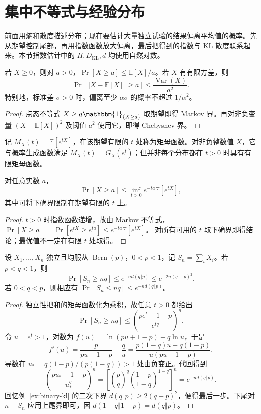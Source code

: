 \documentclass[lang=cn,a4paper,fontset=none,zihao=false,10pt,openany,twoside]{beautybook}
\numberwithin{algorithm}{chapter}
\newcommand{\KLsep}{\mathrel{\Vert}}
\begin{document}
\section{集中不等式与经验分布}\label{sec:concentration}
前面用熵和散度描述分布；现在要估计大量独立试验的结果偏离平均值的概率。先从期望控制尾部，再用指数函数放大偏离，最后把得到的指数与 KL 散度联系起来。本节指数估计中的 $H,D_{\mathrm{KL}},d$ 均使用自然对数。
\begin{proposition}\label{prop:markov-chebyshev}
若 $X\ge0$，则对 $a>0$，$\Pr[X\ge a]\le\mathbb E[X]/a$。若 $X$ 有有限方差，则
\[
 \Pr[|X-\mathbb E[X]|\ge a]\le\frac{\operatorname{Var}(X)}{a^2}.
\]
特别地，标准差 $\sigma>0$ 时，偏离至少 $\alpha\sigma$ 的概率不超过 $1/\alpha^2$。
\end{proposition}
\begin{proof}
点态不等式 $X\ge a\mathbbm{1}_{\{X\ge a\}}$ 取期望即得 Markov 界。再对非负变量 $(X-\mathbb E[X])^2$ 及阈值 $a^2$ 使用它，即得 Chebyshev 界。
\end{proof}
\begin{definition}[矩母函数]
记 $M_X(t)=\mathbb E[e^{tX}]$，在该期望有限的 $t$ 处称为矩母函数。对非负整数值 $X$，它与概率生成函数满足 $M_X(t)=G_X(e^t)$；但并非每个分布都在 $t>0$ 时具有有限矩母函数。
\end{definition}
\begin{proposition}[Chernoff 界]\label{prop:chernoff}
对任意实数 $a$，
\[
 \Pr[X\ge a]\le\inf_{t>0}e^{-ta}\mathbb E[e^{tX}],
\]
其中可将下确界限制在期望有限的 $t$ 上。
\end{proposition}
\begin{proof}
$t>0$ 时指数函数递增，故由 Markov 不等式，
$\Pr[X\ge a]=\Pr[e^{tX}\ge e^{ta}]\le e^{-ta}\mathbb E[e^{tX}]$。
对所有可用的 $t$ 取下确界即得结论；最优值不一定在有限 $t$ 处取得。
\end{proof}
\begin{example}\label{ex:bernoulli-chernoff}
设 $X_1,\ldots,X_n$ 独立且均服从 $\operatorname{Bern}(p)$，$0<p<1$，记 $S_n=\sum_iX_i$。若 $p<q<1$，则
\[
 \Pr[S_n\ge nq]\le e^{-nd(q\KLsep p)}\le e^{-2n(q-p)^2}.
\]
若 $0<q<p$，则相应有 $\Pr[S_n\le nq]\le e^{-nd(q\KLsep p)}$。
\end{example}
\begin{proof}
独立性把和的矩母函数化为乘积，故任意 $t>0$ 都给出
\[
 \Pr[S_n\ge nq]\le\left(\frac{pe^t+1-p}{e^{tq}}\right)^n.
\]
令 $u=e^t>1$，对数为 $f(u)=\ln(pu+1-p)-q\ln u$，于是
\[
 f'(u)=\frac p{pu+1-p}-\frac qu
 =\frac{p(1-q)u-q(1-p)}{u(pu+1-p)}.
\]
导数在 $u_*={q(1-p)}/{(p(1-q))}>1$ 处由负变正。代回得到
\[
 \left(\frac{pu_*+1-p}{u_*^q}\right)^n
 =\left[\left(\frac pq\right)^q\left(\frac{1-p}{1-q}\right)^{1-q}\right]^n
 =e^{-nd(q\KLsep p)}.
\]
回忆例~\ref{ex:binary-kl} 的二次下界 $d(q\KLsep p)\ge2(q-p)^2$，便得最后一步。下尾对 $n-S_n$ 应用上尾界即可，因 $d(1-q\KLsep1-p)=d(q\KLsep p)$。
\end{proof}
\end{document}
